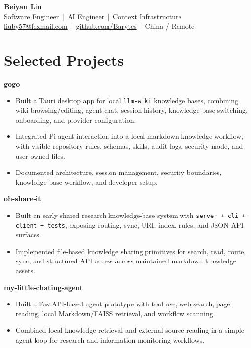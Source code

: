 \documentclass[10pt,letterpaper]{article}
\newcommand{\resumeItem}[1]{\item #1}
\newcommand{\projectHeading}[2]{
  \textbf{#1} \hfill \textit{#2}
}
\begin{document}
\begin{center}
  {\LARGE \textbf{Beiyan Liu}} \\
  \vspace{2pt}
  Software Engineer \,|\, AI Engineer \,|\, Context Infrastructure \\
  \vspace{2pt}
  \href{mailto:liuby57@foxmail.com}{liuby57@foxmail.com} \,|\,
  \href{https://github.com/Barytes}{github.com/Barytes} \,|\,
  China / Remote
\end{center}

\section{Selected Projects}

\projectHeading{\href{https://github.com/Barytes/gogo}{gogo}}{}
\begin{itemize}
  \resumeItem{Built a Tauri desktop app for local \texttt{llm-wiki} knowledge bases, combining wiki browsing/editing, agent chat, session history, knowledge-base switching, onboarding, and provider configuration.}
  \resumeItem{Integrated Pi agent interaction into a local markdown knowledge workflow, with visible repository rules, schemas, skills, audit logs, security mode, and user-owned files.}
  \resumeItem{Documented architecture, session management, security boundaries, knowledge-base workflow, and developer setup.}
\end{itemize}

\projectHeading{\href{https://github.com/Barytes/oh-share-it}{oh-share-it}}{}
\begin{itemize}
  \resumeItem{Built an early shared research knowledge-base system with \texttt{server + cli + client + tests}, exposing routing, sync, URI, index, rules, and JSON API surfaces.}
  \resumeItem{Implemented file-based knowledge sharing primitives for search, read, route, sync, and structured API access across maintained markdown knowledge assets.}
\end{itemize}

\projectHeading{\href{https://github.com/Barytes/my-little-chating-agent}{my-little-chating-agent}}{}
\begin{itemize}
  \resumeItem{Built a FastAPI-based agent prototype with tool use, web search, page reading, local Markdown/FAISS retrieval, and workflow scanning.}
  \resumeItem{Combined local knowledge retrieval and external source reading in a simple agent loop for research and information monitoring workflows.}
\end{itemize}
\end{document}
